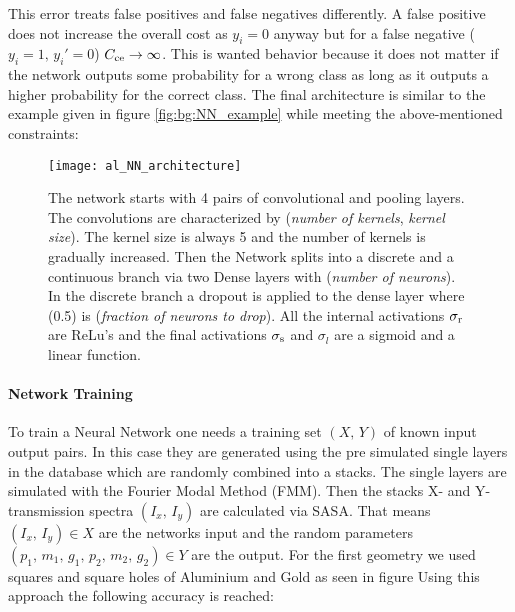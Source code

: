 \noindent
This error treats false positives and false negatives differently. A false positive does not increase the overall cost as $y_i = 0$ anyway but for a false negative ($y_i = 1, \, y_i' = 0$) $C_{\mathrm{ce}} \rightarrow \infty$. This is wanted behavior because it does not matter if the network outputs some probability for a wrong class as long as it outputs a higher probability for the correct class. The final architecture is similar to the example given in figure \ref{fig:bg:NN_example} while meeting the above-mentioned constraints:

\begin{figure}[H]
    \centering
    \texttt{[image: al\_NN\_architecture]}
    \caption{The network starts with 4 pairs of convolutional and pooling layers. The convolutions are characterized by (\textit{number of kernels}, \textit{kernel size}). The kernel size is always 5 and the number of kernels is gradually increased. Then the Network splits into a discrete and a continuous branch via two Dense layers with (\textit{number of neurons}). In the discrete branch a dropout is applied to the dense layer where (0.5) is (\textit{fraction of neurons to drop}).
    All the internal activations $\sigma_{\mathrm{r}}$ are ReLu's and the final activations $\sigma_{\mathrm{s}}$ and $\sigma_{l}$ are a sigmoid and a linear function.}
    \label{fig:al:NN_architecture}
\end{figure}

\newpage
\paragraph{Network Training}
To train a Neural Network one needs a training set $(X, \, Y)$ of known input output pairs. In this case they are generated using the pre simulated single layers in the database which are randomly combined into a stacks. The single layers are simulated with the Fourier Modal Method (FMM). Then the stacks X- and Y-transmission spectra $(I_x, \, I_y)$ are calculated via SASA.
That means $(I_x, \, I_y) \in X$ are the networks input and the random parameters $(p_1, \, m_1, \, g_1, \, p_2, \, m_2, \, g_2) \in Y$ are the output. For the first geometry we used squares and square holes of Aluminium and Gold as seen in figure
Using this approach the following accuracy is reached:

